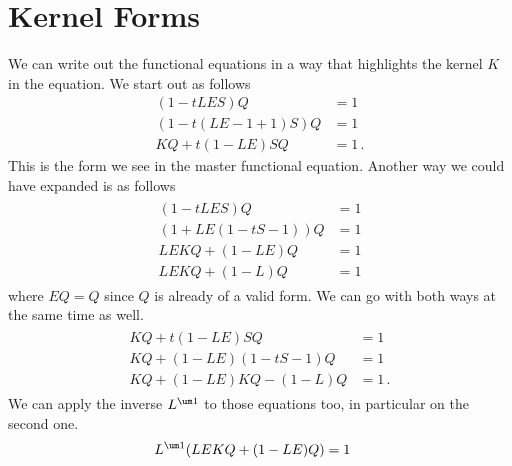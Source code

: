 \section{Kernel Forms}
We can write out the functional equations in a way that highlights the kernel $K$ in the equation. We start out as follows
\begin{align}
	(1-tLES)Q &= 1\\
	(1-t(LE-1+1)S)Q &=1\\
	KQ + t(1-LE)SQ &= 1\,.
\end{align}
This is the form we see in the master functional equation. Another way we could have expanded is as follows
\begin{align}
\begin{split}
	(1-tLES)Q &= 1\\
	(1+LE(1-tS-1))Q &= 1\\
	LEKQ+(1-LE)Q &= 1\\
	LEKQ+(1-L)Q &= 1
\end{split}	
\end{align}
where $EQ = Q$ since $Q$ is already of a valid form. We can go with both ways at the same time as well.
\begin{align}\begin{split}
	KQ + t(1-LE)SQ &= 1\\
	KQ + (1-LE)(1-tS-1)Q &=1\\
	KQ + (1-LE)KQ - (1-L)Q &= 1\,.
\end{split}\end{align}
We can apply the inverse $L^{\um 1}$ to those equations too, in particular on the second one.
\begin{align}
\begin{split}
	L^{\um 1}(LEKQ+(1-LE)Q) &= 1
\end{split}	
\end{align}

